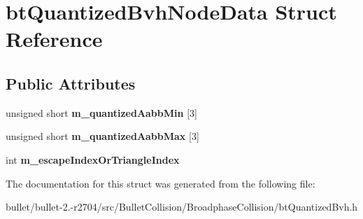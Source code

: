 \hypertarget{structbt_quantized_bvh_node_data}{\section{bt\+Quantized\+Bvh\+Node\+Data Struct Reference}
\label{structbt_quantized_bvh_node_data}
}
\subsection*{Public Attributes}
\begin{DoxyCompactItemize}
\item 
\hypertarget{structbt_quantized_bvh_node_data_acfcfbb923df8b745f25dc7a6856f3d3c}{unsigned short {\bfseries m\+\_\+quantized\+Aabb\+Min} \mbox{[}3\mbox{]}}\label{structbt_quantized_bvh_node_data_acfcfbb923df8b745f25dc7a6856f3d3c}

\item 
\hypertarget{structbt_quantized_bvh_node_data_aa58231ddd8d03d30d5d56ad1b546d13c}{unsigned short {\bfseries m\+\_\+quantized\+Aabb\+Max} \mbox{[}3\mbox{]}}\label{structbt_quantized_bvh_node_data_aa58231ddd8d03d30d5d56ad1b546d13c}

\item 
\hypertarget{structbt_quantized_bvh_node_data_a1af8a825fe24ebe47229c3fd72cddf58}{int {\bfseries m\+\_\+escape\+Index\+Or\+Triangle\+Index}}\label{structbt_quantized_bvh_node_data_a1af8a825fe24ebe47229c3fd72cddf58}

\end{DoxyCompactItemize}


The documentation for this struct was generated from the following file\+:\begin{DoxyCompactItemize}
\item 
bullet/bullet-\/2.-\/r2704/src/\+Bullet\+Collision/\+Broadphase\+Collision/bt\+Quantized\+Bvh.\+h\end{DoxyCompactItemize}

